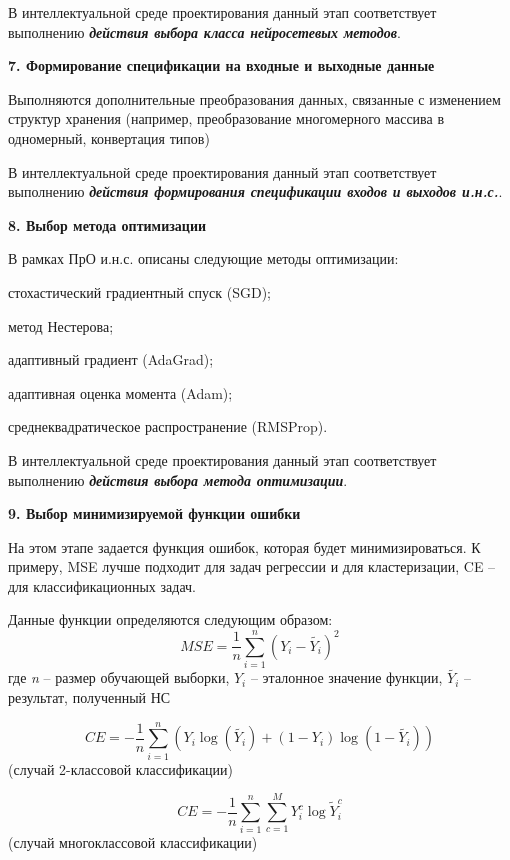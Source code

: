 В интеллектуальной среде проектирования данный этап соответствует выполнению \textbf{\textit{действия выбора класса нейросетевых методов}}.


\textbf{7. Формирование спецификации на входные и выходные данные}

Выполняются дополнительные преобразования данных, связанные с изменением структур хранения (например, преобразование многомерного массива в одномерный, конвертация типов)

В интеллектуальной среде проектирования данный этап соответствует выполнению \textbf{\textit{действия формирования спецификации входов и выходов и.н.с.}}.


\textbf{8. Выбор метода оптимизации }

В рамках ПрО и.н.с. описаны следующие методы оптимизации:
\begin{textitemize}
	\item стохастический градиентный спуск (SGD);
	\item метод Нестерова;
	\item адаптивный градиент (AdaGrad);
	\item адаптивная оценка момента (Adam);
	\item среднеквадратическое распространение (RMSProp).
\end{textitemize}

В интеллектуальной среде проектирования данный этап соответствует выполнению \textbf{\textit{действия выбора метода оптимизации}}.


\textbf{9. Выбор минимизируемой функции ошибки}

На этом этапе задается функция ошибок, которая будет минимизироваться. К примеру, MSE лучше подходит для задач регрессии и для кластеризации, CE -- для классификационных задач.

Данные функции определяются следующим образом:
\begin{equation*}
	MSE = \frac{1}{n} \sum_{i=1}^n (Y_i - \widetilde{Y_i})^2
\end{equation*}
где \textit{n} -- размер обучающей выборки, $Y_i$ -- эталонное значение функции, $\widetilde{Y_i}$ -- результат, полученный НС

\begin{equation*}
	CE = - \frac{1}{n} \sum_{i=1}^n (Y_i\log(\widetilde{Y_i}) + (1-Y_i)\log(1 - \widetilde{Y_i}))
\end{equation*}
(случай 2-классовой классификации)

\begin{equation*}
	CE = - \frac{1}{n} \sum_{i=1}^n \sum_{c=1}^M Y_i^c \log{\widetilde{Y}_i^c}
\end{equation*}
(случай многоклассовой классификации)

